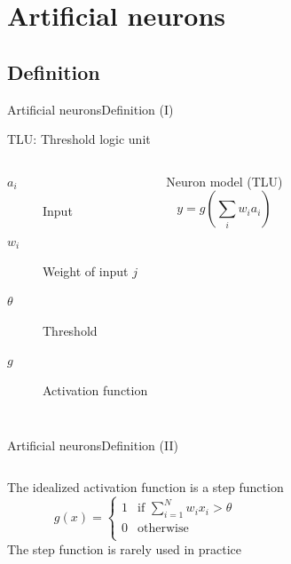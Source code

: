 \documentclass[10pt,compress]{beamer} %
\begin{document}
\section{Artificial neurons}

\subsection{Definition}

\begin{frame}{Artificial neurons}{Definition (I)}

    TLU: Threshold logic unit\\

    

	\bigskip
    \begin{columns}
		\begin{description}
		\item[$a_i$] Input
		\item[$w_{i}$] Weight of input $j$
		\item[$\theta$] Threshold
		\item[$g$] Activation function
		\end{description}

	    \begin{block}{Neuron model (TLU)}
	   \vspace{-0.5cm}
	   \begin{equation*}
	   y=g\left( \sum_{i} w_{i} a_i \right)
	   \end{equation*}
	   \end{block}
    \end{columns}
\end{frame}

\begin{frame}{Artificial neurons}{Definition (II)}
	\begin{columns}
	The idealized activation function is a step function
	\begin{equation*}
	g(x) =
	  \begin{cases}
	      	1  & \text{if } \sum_{i=1}^{N} w_i x_i > \theta\\
	  	0  & \text{otherwise}\\
	  \end{cases}
	\end{equation*}
	The step function is rarely used in practice

 	\end{columns}

\end{frame}
\end{document}
